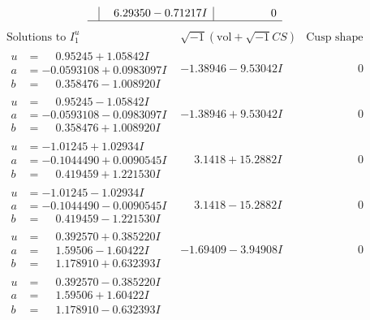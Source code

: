 \documentclass[1p]{elsarticle_modified}
\theoremstyle{definition}
\newcommand{\I}{\sqrt{-1}}
\begin{document}
$$\begin{array}{c|c|c}
 & \phantom{-}6.29350 - 0.71217 I & \phantom{-0.000000 } 0\\
 \hline 
 \end{array}$$\newpage$$\begin{array}{c|c|c}  
\text{Solutions to }I^u_{1}& \I (\text{vol} + \sqrt{-1}CS) & \text{Cusp shape}\\
 \hline 
\begin{aligned}
u &= \phantom{-}0.95245 + 1.05842 I \\
a &= -0.0593108 + 0.0983097 I \\
b &= \phantom{-}0.358476 - 1.008920 I\end{aligned}
 & -1.38946 - 9.53042 I & \phantom{-0.000000 } 0 \\ \hline\begin{aligned}
u &= \phantom{-}0.95245 - 1.05842 I \\
a &= -0.0593108 - 0.0983097 I \\
b &= \phantom{-}0.358476 + 1.008920 I\end{aligned}
 & -1.38946 + 9.53042 I & \phantom{-0.000000 } 0 \\ \hline\begin{aligned}
u &= -1.01245 + 1.02934 I \\
a &= -0.1044490 + 0.0090545 I \\
b &= \phantom{-}0.419459 + 1.221530 I\end{aligned}
 & \phantom{-}3.1418 + 15.2882 I & \phantom{-0.000000 } 0 \\ \hline\begin{aligned}
u &= -1.01245 - 1.02934 I \\
a &= -0.1044490 - 0.0090545 I \\
b &= \phantom{-}0.419459 - 1.221530 I\end{aligned}
 & \phantom{-}3.1418 - 15.2882 I & \phantom{-0.000000 } 0 \\ \hline\begin{aligned}
u &= \phantom{-}0.392570 + 0.385220 I \\
a &= \phantom{-}1.59506 - 1.60422 I \\
b &= \phantom{-}1.178910 + 0.632393 I\end{aligned}
 & -1.69409 - 3.94908 I & \phantom{-0.000000 } 0 \\ \hline\begin{aligned}
u &= \phantom{-}0.392570 - 0.385220 I \\
a &= \phantom{-}1.59506 + 1.60422 I \\
b &= \phantom{-}1.178910 - 0.632393 I\end{aligned}

\end{array}$$
\end{document}
